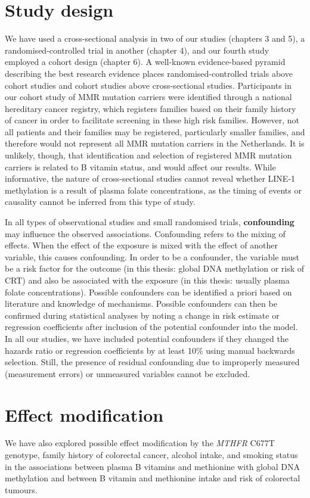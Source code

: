 \section[]{Study design} %
We have used a cross-sectional analysis in two of our studies (chapters 3 and 5), a randomised-controlled trial in another (chapter 4), and our fourth study employed a cohort design (chapter 6). A well-known evidence-based pyramid describing the best research evidence places randomised-controlled trials above cohort studies and cohort studies above cross-sectional studies. Participants in our cohort study of MMR mutation carriers were identified through a national hereditary cancer registry, which registers families based on their family history of cancer in order to facilitate screening in these high risk families. However, not all patients and their families may be registered, particularly smaller families, and therefore would not represent all MMR mutation carriers in the Netherlands. It is unlikely, though, that identification and selection of registered MMR mutation carriers is related to B vitamin status, and would affect our results. While informative, the nature of cross-sectional studies cannot 
reveal whether LINE-1 methylation is a result of plasma folate concentrations, as the timing of events or causality cannot be inferred from this type of study. 
 
\noindent In all types of observational studies and small randomised trials, \textbf{confounding} may influence the observed associations. Confounding refers to the mixing of effects. When the effect of the exposure is mixed with the effect of another variable, this causes confounding. In order to be a confounder, the variable must be a risk factor for the outcome (in this thesis: global DNA methylation or risk of CRT) and also be associated with the exposure (in this thesis: usually plasma folate concentrations). Possible confounders can be identified a priori based on literature and knowledge of mechanisms. Possible confounders can then be confirmed during statistical analyses by noting a change in risk estimate or regression coefficients after inclusion of the potential confounder into the model. In all our studies, we have included potential confounders if they changed the hazards ratio or regression coefficients by at least 10\% using manual backwards selection. Still, the presence of residual 
confounding due to improperly measured (measurement errors) or unmeasured variables cannot be excluded. 
 
\section[]{Effect modification} %
We have also explored possible effect modification by the \emph{MTHFR} C677T genotype, family history of colorectal cancer, alcohol intake, and smoking status in the associations between plasma B vitamins and methionine with global DNA methylation and between B vitamin and methionine intake and risk of colorectal tumours. 
 
